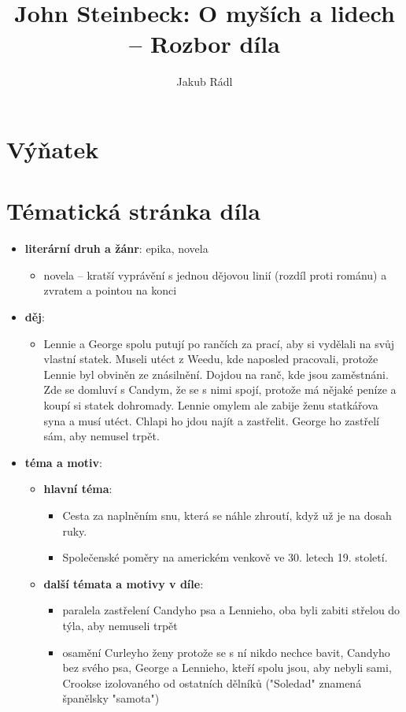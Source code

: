 \documentclass[10pt,a4paper]{article}
\date{}
\author{Jakub Rádl}
\title{John Steinbeck: O myších a lidech -- Rozbor díla}
\begin{document}
\maketitle

\section*{Výňatek}

\section*{Tématická stránka díla}
\begin{itemize}
\item \textbf{literární druh a žánr}: epika, novela
	\begin{itemize}
	\item novela -- kratší vyprávění s jednou dějovou linií (rozdíl proti románu) a zvratem a pointou na konci
	\end{itemize}
\item \textbf{děj}:
	\begin{itemize}
	\item Lennie a George spolu putují po rančích za prací, aby si vydělali na svůj vlastní statek. Museli utéct z Weedu, kde naposled pracovali, protože Lennie byl obviněn ze znásilnění. Dojdou na ranč, kde jsou zaměstnáni. Zde se domluví s Candym, že se s nimi spojí, protože má nějaké peníze a koupí si statek dohromady. Lennie omylem ale zabije ženu statkářova syna a musí utéct. Chlapi ho jdou najít a zastřelit. George ho zastřelí sám, aby nemusel trpět.
	\end{itemize}
\item \textbf{téma a motiv}:
	\begin{itemize}
	\item \textbf{hlavní téma}: 
		\begin{itemize}
		\item Cesta za naplněním snu, která se náhle zhroutí, když už je na dosah ruky. 
		\item Společenské poměry na americkém venkově ve 30. letech 19. století.
		\end{itemize}			
	\item \textbf{další témata a motivy v díle}:
		\begin{itemize}
		\item paralela zastřelení Candyho psa a Lennieho, oba byli zabiti střelou do týla, aby nemuseli trpět
		\item osamění Curleyho ženy protože se s ní nikdo nechce bavit, Candyho bez svého psa, George a Lennieho, kteří spolu jsou, aby nebyli sami, Crookse izolovaného od ostatních dělníků ("Soledad" znamená španělsky "samota")

\end{itemize}
\end{itemize}
\end{itemize}
\end{document}
